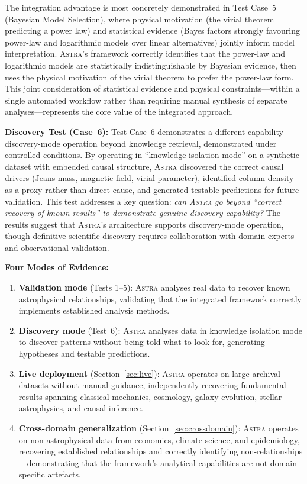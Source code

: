 \documentclass[fleqn,usenatbib]{mnras}
\newcommand{\astra}{\textsc{Astra}\xspace}
\begin{document}
The integration advantage is most concretely demonstrated in Test Case~5 (Bayesian Model Selection), where physical motivation (the virial theorem predicting a power law) and statistical evidence (Bayes factors strongly favouring power-law and logarithmic models over linear alternatives) jointly inform model interpretation.
\astra's framework correctly identifies that the power-law and logarithmic models are statistically indistinguishable by Bayesian evidence, then uses the physical motivation of the virial theorem to prefer the power-law form.
This joint consideration of statistical evidence and physical constraints---within a single automated workflow rather than requiring manual synthesis of separate analyses---represents the core value of the integrated approach.

\textbf{Discovery Test (Case~6):}
Test Case~6 demonstrates a different capability---discovery-mode operation beyond knowledge retrieval, demonstrated under controlled conditions.
By operating in ``knowledge isolation mode'' on a synthetic dataset with embedded causal structure, \astra discovered the correct causal drivers (Jeans mass, magnetic field, virial parameter), identified column density as a proxy rather than direct cause, and generated testable predictions for future validation.
This test addresses a key question: \emph{can \astra go beyond ``correct recovery of known results'' to demonstrate genuine discovery capability?}
The results suggest that \astra's architecture supports discovery-mode operation, though definitive scientific discovery requires collaboration with domain experts and observational validation.

\textbf{Four Modes of Evidence:}
\begin{enumerate}
  \item[(i)] \textbf{Validation mode} (Tests 1--5): \astra analyses real data to recover known astrophysical relationships, validating that the integrated framework correctly implements established analysis methods.
  \item[(ii)] \textbf{Discovery mode} (Test~6): \astra analyses data in knowledge isolation mode to discover patterns without being told what to look for, generating hypotheses and testable predictions.
  \item[(iii)] \textbf{Live deployment} (Section~\ref{sec:live}): \astra operates on large archival datasets without manual guidance, independently recovering fundamental results spanning classical mechanics, cosmology, galaxy evolution, stellar astrophysics, and causal inference.
  \item[(iv)] \textbf{Cross-domain generalization} (Section~\ref{sec:crossdomain}): \astra operates on non-astrophysical data from economics, climate science, and epidemiology, recovering established relationships and correctly identifying non-relationships---demonstrating that the framework's analytical capabilities are not domain-specific artefacts.
\end{enumerate}
\end{document}
